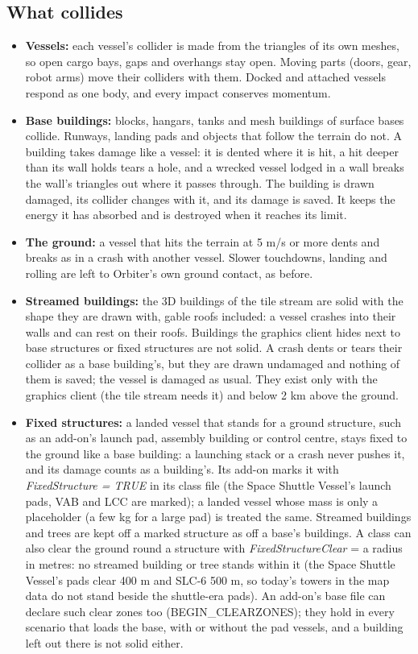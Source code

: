 \documentclass[Orbiter User Manual.tex]{subfiles}
\begin{document}
\subsection{What collides}
\begin{itemize}
\item \textbf{Vessels:} each vessel's collider is made from the triangles of its own meshes, so open cargo bays, gaps and overhangs stay open. Moving parts (doors, gear, robot arms) move their colliders with them. Docked and attached vessels respond as one body, and every impact conserves momentum.
\item \textbf{Base buildings:} blocks, hangars, tanks and mesh buildings of surface bases collide. Runways, landing pads and objects that follow the terrain do not. A building takes damage like a vessel: it is dented where it is hit, a hit deeper than its wall holds tears a hole, and a wrecked vessel lodged in a wall breaks the wall's triangles out where it passes through. The building is drawn damaged, its collider changes with it, and its damage is saved. It keeps the energy it has absorbed and is destroyed when it reaches its limit.
\item \textbf{The ground:} a vessel that hits the terrain at 5 m/s or more dents and breaks as in a crash with another vessel. Slower touchdowns, landing and rolling are left to Orbiter's own ground contact, as before.
\item \textbf{Streamed buildings:} the 3D buildings of the tile stream are solid with the shape they are drawn with, gable roofs included: a vessel crashes into their walls and can rest on their roofs. Buildings the graphics client hides next to base structures or fixed structures are not solid. A crash dents or tears their collider as a base building's, but they are drawn undamaged and nothing of them is saved; the vessel is damaged as usual. They exist only with the graphics client (the tile stream needs it) and below 2 km above the ground.
\item \textbf{Fixed structures:} a landed vessel that stands for a ground structure, such as an add-on's launch pad, assembly building or control centre, stays fixed to the ground like a base building: a launching stack or a crash never pushes it, and its damage counts as a building's. Its add-on marks it with \textit{FixedStructure = TRUE} in its class file (the Space Shuttle Vessel's launch pads, VAB and LCC are marked); a landed vessel whose mass is only a placeholder (a few kg for a large pad) is treated the same. Streamed buildings and trees are kept off a marked structure as off a base's buildings. A class can also clear the ground round a structure with \textit{FixedStructureClear} = a radius in metres: no streamed building or tree stands within it (the Space Shuttle Vessel's pads clear 400 m and SLC-6 500 m, so today's towers in the map data do not stand beside the shuttle-era pads). An add-on's base file can declare such clear zones too (BEGIN\_CLEARZONES); they hold in every scenario that loads the base, with or without the pad vessels, and a building left out there is not solid either.
\end{itemize}
\end{document}
